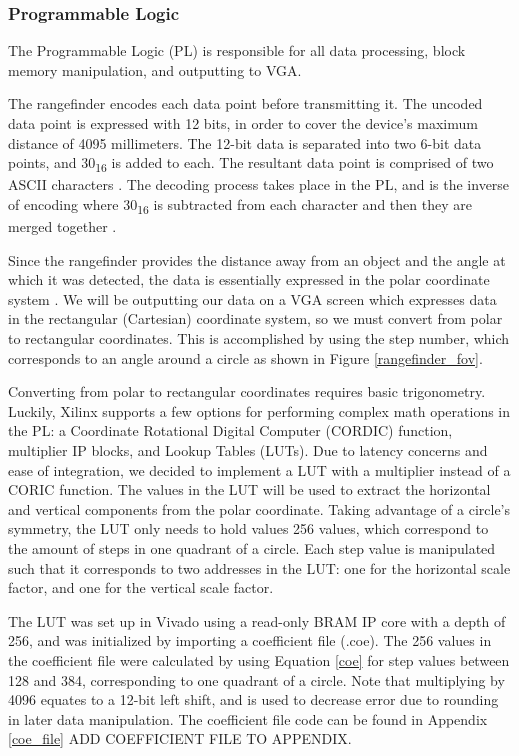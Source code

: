 \subsubsection{Programmable Logic}
The Programmable Logic (PL) is responsible for all data processing, block memory manipulation, and outputting to VGA.
\par
The rangefinder encodes each data point before transmitting it. The uncoded data point is expressed with 12 bits, in order to cover the device's maximum distance of 4095 millimeters. The 12-bit data is separated into two 6-bit data points, and 30\textsubscript{16} is added to each. The resultant data point is comprised of two ASCII characters \cite{ascii}. The decoding process takes place in the PL, and is the inverse of encoding where 30\textsubscript{16} is subtracted from each character and then they are merged together \cite{urg04lx_datasheet}.
\par
Since the rangefinder provides the distance away from an object and the angle at which it was detected, the data is essentially expressed in the polar coordinate system \cite{polar_coordinates}. We will be outputting our data on a VGA screen which expresses data in the rectangular (Cartesian) coordinate system, so we must convert from polar to rectangular coordinates. This is accomplished by using the step number, which corresponds to an angle around a circle as shown in Figure \ref{rangefinder_fov}.
\par
Converting from polar to rectangular coordinates requires basic trigonometry. Luckily, Xilinx supports a few options for performing complex math operations in the PL: a Coordinate Rotational Digital Computer (CORDIC) function, multiplier IP blocks, and Lookup Tables (LUTs). Due to latency concerns and ease of integration, we decided to implement a LUT with a multiplier instead of a CORIC function. The values in the LUT will be used to extract the horizontal and vertical components from the polar coordinate. Taking advantage of a circle's symmetry, the LUT only needs to hold values 256 values, which correspond to the amount of steps in one quadrant of a circle. Each step value is manipulated such that it corresponds to two addresses in the LUT: one for the horizontal scale factor, and one for the vertical scale factor.
\par
The LUT was set up in Vivado using a read-only BRAM IP core with a depth of 256, and was initialized by importing a coefficient file (.coe). The 256 values in the coefficient file were calculated by using Equation \ref{coe} for step values between 128 and 384, corresponding to one quadrant of a circle. Note that multiplying by 4096 equates to a 12-bit left shift, and is used to decrease error due to rounding in later data manipulation. The coefficient file code can be found in Appendix \ref{coe_file} ADD COEFFICIENT FILE TO APPENDIX.

